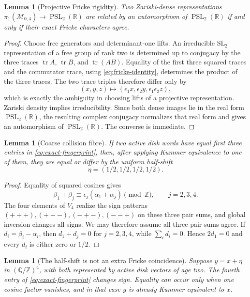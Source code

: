 \documentclass[11pt]{article}
\newtheorem{lemma}[theorem]{Lemma}
\theoremstyle{definition}
\theoremstyle{remark}
\newcommand{\Q}{\mathbb Q}
\newcommand{\Z}{\mathbb Z}
\newcommand{\R}{\mathbb R}
\newcommand{\M}{\mathcal M}
\newcommand{\PSL}{\operatorname{PSL}}
\begin{document}
\begin{lemma}[Projective Fricke rigidity]\label{lem:projective-fricke}
Two Zariski-dense representations $\pi_1(\M_{0,4})\to\PSL_2(\R)$ are related by an automorphism of $\PSL_2(\R)$ if and only if their exact Fricke characters agree.
\end{lemma}

\begin{proof}
Choose free generators and determinant-one lifts.  An irreducible $\mathrm{SL}_2$ representation of a free group of rank two is determined up to conjugacy by the three traces
$\operatorname{tr}A$, $\operatorname{tr}B$, and $\operatorname{tr}(AB)$.  Equality of the first three squared traces and the commutator trace, using \eqref{eq:fricke-identity}, determines the product of the three traces.  The two trace triples therefore differ only by
\[
 (x,y,z)\mapsto(\epsilon_1x,\epsilon_2y,\epsilon_1\epsilon_2z),
\]
which is exactly the ambiguity in choosing lifts of a projective representation.  Zariski density implies irreducibility.  Since both dense images lie in the real form $\PSL_2(\R)$, the resulting complex conjugacy normalizes that real form and gives an automorphism of $\PSL_2(\R)$.  The converse is immediate.
\end{proof}

\begin{lemma}[Coarse collision fibre]\label{lem:coarse-collision}
If two active disk words have equal first three entries in \eqref{eq:exact-fingerprint}, then, after applying Kummer equivalence to one of them, they are equal or differ by the uniform half-shift
\[
 \eta=(1/2,1/2,1/2,1/2).
\]
\end{lemma}

\begin{proof}
Equality of squared cosines gives
\[
 \beta_1+\beta_j\equiv\epsilon_j(\alpha_1+\alpha_j)\pmod\Z,
 \qquad j=2,3,4.
\]
The four elements of $V_4$ realize the sign patterns
$(+++),(+--),(-+-),(--+)$ on these three pair sums, and global inversion changes all signs.  We may therefore assume all three pair sums agree.  If $d_i=\beta_i-\alpha_i$, then $d_1+d_j=0$ for $j=2,3,4$, while $\sum_i d_i=0$.  Hence $2d_1=0$ and every $d_i$ is either zero or $1/2$.
\end{proof}

\begin{lemma}[The half-shift is not an extra Fricke coincidence]\label{lem:half-shift}
Suppose $y=x+\eta$ in $(\Q/\Z)^4$, with both represented by active disk vectors of age two.  The fourth entry of \eqref{eq:exact-fingerprint} changes sign.  Equality can occur only when one cosine factor vanishes, and in that case $y$ is already Kummer-equivalent to $x$.
\end{lemma}
\end{document}
